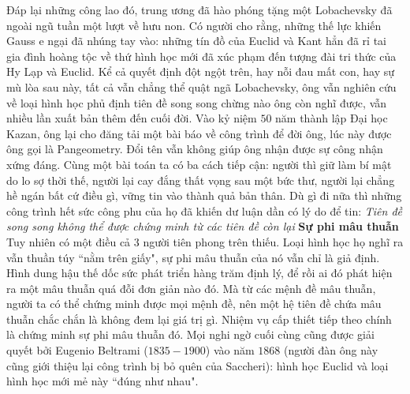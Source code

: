 \begin{multicols}{2}
	\vskip 0.1cm
	Đáp lại những công lao đó, trung ương đã hào phóng tặng một Lobachevsky đã ngoài ngũ tuần một lượt về hưu non. Có người cho rằng, những thế lực khiến Gauss e ngại đã nhúng tay vào: những tín đồ của Euclid và Kant hẳn đã rỉ tai gia đình hoàng tộc về thứ hình học mới đã xúc phạm đến tượng đài tri thức của  Hy Lạp và Euclid. Kể cả quyết định đột ngột trên, hay nỗi đau mất con, hay sự mù lòa sau này, tất cả vẫn chẳng thể quật ngã Lobachevsky, ông vẫn nghiên cứu về loại hình học phủ định tiên đề song song chừng nào ông còn nghĩ được, vẫn nhiều lần xuất bản thêm đến cuối đời. Vào kỷ niệm $50$ năm thành lập Đại học Kazan, ông lại cho đăng tải một bài báo về công trình để đời ông, lúc này được ông gọi là Pangeometry. Đổi tên vẫn không giúp ông nhận được sự công nhận xứng đáng.
	\vskip 0.1cm
	Cùng một bài toán ta có ba cách tiếp cận: người thì giữ làm bí mật do lo sợ thời thế, người lại cay đắng thất vọng sau một bức thư, người lại chẳng hề ngán bất cứ điều gì, vững tin vào thành quả bản thân. Dù gì đi nữa thì những công trình hết sức công phu của họ đã khiến dư luận dần có lý do để tin:
	\vskip 0.1cm
	\textit{Tiên đề song song không thể được chứng minh từ các tiên đề còn lại} 
	\vskip 0.1cm
	\textbf{\color{lichsutoanhoc}Sự phi mâu thuẫn}
	\vskip 0.1cm
	Tuy nhiên có một điều cả $3$ người tiên phong trên thiếu. Loại hình học họ nghĩ ra vẫn thuần túy ``nằm trên giấy", sự phi mâu thuẫn của nó vẫn chỉ là giả định. Hình dung hậu thế dốc sức phát triển hàng trăm định lý, để rồi ai đó phát hiện ra một mâu thuẫn quá đỗi đơn giản nào đó. Mà từ các mệnh đề mâu thuẫn, người ta có thể chứng minh được mọi mệnh đề, nên một hệ tiên đề chứa mâu thuẫn chắc chắn là không đem lại giá trị gì. Nhiệm vụ cấp thiết tiếp theo chính là chứng minh sự phi mâu thuẫn đó.
	\vskip 0.1cm
	Mọi nghi ngờ cuối cùng cũng được giải quyết bởi Eugenio Beltrami ($1835-1900$) vào năm $1868$ (người đàn ông này cũng giới thiệu lại công trình bị bỏ quên của Saccheri): hình học Euclid và loại hình học mới mẻ này ``đúng như nhau". 
	\begin{figure}[H]
		\vspace*{5pt}
		\centering
		\captionsetup{labelformat= empty, justification=centering}

\end{figure}
\end{multicols}
